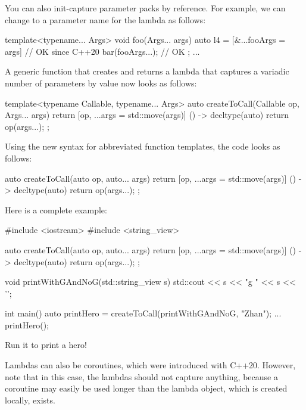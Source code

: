 You can also init-capture parameter packs by reference. For example, we can change to a parameter name for the lambda as follows:

\begin{cpp}
template<typename... Args>
void foo(Args... args)
{
	auto l4 = [&...fooArgs = args] { // OK since C++20
				bar(fooArgs...); // OK
			};
	...
}
\end{cpp}


A generic function that creates and returns a lambda that captures a variadic number of parameters by value now looks as follows:

\begin{cpp}
template<typename Callable, typename... Args>
auto createToCall(Callable op, Args... args)
{
	return [op, ...args = std::move(args)] () -> decltype(auto) {
				return op(args...);
			};
}
\end{cpp}

Using the new syntax for abbreviated function templates, the code looks as follows:

\begin{cpp}
auto createToCall(auto op, auto... args)
{
	return [op, ...args = std::move(args)] () -> decltype(auto) {
				return op(args...);
			};
}
\end{cpp}

Here is a complete example:


\begin{cpp}
#include <iostream>
#include <string_view>

auto createToCall(auto op, auto... args)
{
	return [op, ...args = std::move(args)] () -> decltype(auto) {
		return op(args...);
	};
}

void printWithGAndNoG(std::string_view s)
{
	std::cout << s << "g " << s << '\n';
}

int main()
{
	auto printHero = createToCall(printWithGAndNoG, "Zhan");
	...
	printHero();
}
\end{cpp}

Run it to print a hero!


Lambdas can also be coroutines, which were introduced with C++20. However, note that in this case, the lambdas should not capture anything, because a coroutine may easily be used longer than the lambda object, which is created locally, exists.













